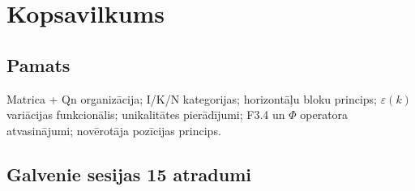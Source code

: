 \documentclass[12pt,a4paper]{article}
\begin{document}
\newpage

\section{Kopsavilkums}
\label{sec:kopsavilkums}

\subsection*{Pamats}

Matrica + Qn organizācija; I/K/N kategorijas; horizontāļu bloku princips; $\varepsilon(k)$ variācijas funkcionālis; unikalitātes pierādījumi; F3.4 un $\Phi$ operatora atvasinājumi; novērotāja pozīcijas princips.

\subsection*{Galvenie sesijas 15 atradumi}
\end{document}
